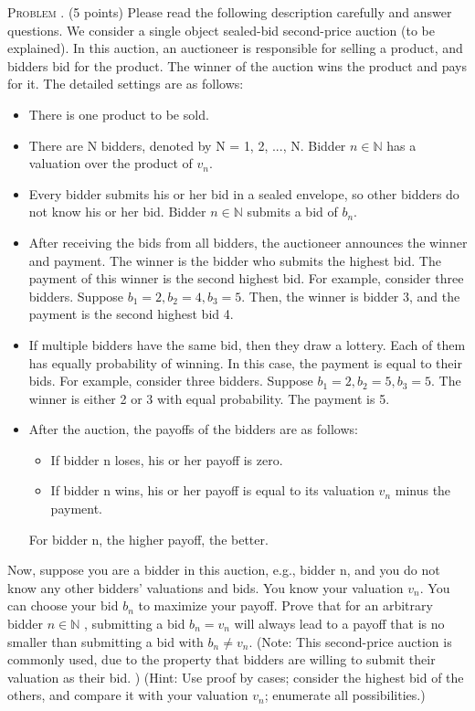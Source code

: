 \documentclass[12pt, a4paper, oneside]{article}
\newenvironment{problem}{\stepcounter{problemname}\par\noindent\textsc{Problem \arabic{problemname}. }}{\\\par}
\newcounter{problemname}
\begin{document}
\begin{problem}
(5 points) Please read the following description carefully and answer questions. We consider a single object sealed-bid second-price auction (to be explained). In this auction, an auctioneer is responsible for selling a product, and bidders bid for the product. The winner of the auction wins
the product and pays for it. The detailed settings are as follows:
\begin{itemize}
\item There is one product to be sold.
\item There are N bidders, denoted by N = {1, 2, ..., N}. Bidder $n \in \mathbb{N}$ has a valuation over the product of $v_{n}$.
\item Every bidder submits his or her bid in a sealed envelope, so other bidders do not know his
or her bid. Bidder $n \in \mathbb{N}$ submits a bid of $b_{n}$.
\item  After receiving the bids from all bidders, the auctioneer announces the winner and payment.
The winner is the bidder who submits the highest bid. The payment of this winner is the
second highest bid. For example, consider three bidders. Suppose $b_{1} = 2, b_{2} = 4, b_{3} = 5$.
Then, the winner is bidder 3, and the payment is the second highest bid 4.
\item If multiple bidders have the same bid, then they draw a lottery. Each of them has equally
probability of winning. In this case, the payment is equal to their bids. For example,
consider three bidders. Suppose $b_{1} = 2, b_{2}= 5, b_{3} = 5$. The winner is either 2 or 3 with
equal probability. The payment is 5.
\item After the auction, the payoffs of the bidders are as follows:
    \begin{itemize}
        \item If bidder n loses, his or her payoff is zero.
        \item  If bidder n wins, his or her payoff is equal to its valuation $v_{n}$ minus the payment.
    \end{itemize}
    
For bidder n, the higher payoff, the better.
\end{itemize}
Now, suppose you are a bidder in this auction, e.g., bidder n, and you do not know any other
bidders' valuations and bids. You know your valuation $v_{n}$. You can choose your bid $b_{n}$ to maximize your payoff. Prove that for an arbitrary bidder $n \in \mathbb{N}$ , submitting a bid $b_{n} = v_{n}$ will always lead
to a payoff that is no smaller than submitting a bid with $b_{n} \neq v_{n}$.
(Note: This second-price auction is commonly used, due to the property that bidders are willing
to submit their valuation as their bid. )
(Hint: Use proof by cases; consider the highest bid of the others, and compare it with your
valuation $v_{n}$; enumerate all possibilities.)
\end{problem}
\end{document}
